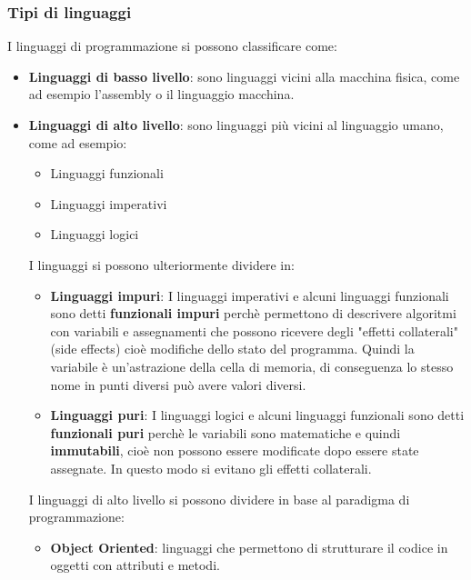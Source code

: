 \documentclass[a4paper]{article}
\begin{document}
\subsubsection{Tipi di linguaggi}
I linguaggi di programmazione si possono classificare come:
\begin{itemize}
  \item \textbf{Linguaggi di basso livello}: sono linguaggi vicini alla macchina fisica,
    come ad esempio l'assembly o il linguaggio macchina.

  \item \textbf{Linguaggi di alto livello}: sono linguaggi più vicini al linguaggio umano,
    come ad esempio:
    \begin{itemize}
      \item Linguaggi funzionali
      \item Linguaggi imperativi
      \item Linguaggi logici
    \end{itemize}

    \vspace{1em}
    \noindent
    I linguaggi si possono ulteriormente dividere in:
    \begin{itemize}
      \item \textbf{Linguaggi impuri}: 
        I linguaggi imperativi e alcuni linguaggi funzionali sono detti \textbf{funzionali impuri}
        perchè permettono di descrivere algoritmi con variabili e assegnamenti che
        possono ricevere degli "effetti collaterali" (side effects) cioè modifiche
        dello stato del programma. Quindi la variabile è un'astrazione della cella di memoria,
        di conseguenza lo stesso nome in punti diversi può avere valori diversi.

      \item \textbf{Linguaggi puri}:
        I linguaggi logici e alcuni linguaggi funzionali sono detti \textbf{funzionali puri}
        perchè le variabili sono matematiche e quindi \textbf{immutabili}, cioè non possono
        essere modificate dopo essere state assegnate. In questo modo si evitano gli
        effetti collaterali.
    \end{itemize}

    \vspace{1em}
    \noindent
    I linguaggi di alto livello si possono dividere in base al paradigma di programmazione:
    \begin{itemize}
      \item \textbf{Object Oriented}: linguaggi che permettono di strutturare il codice
        in oggetti con attributi e metodi.


\end{itemize}
\end{itemize}
\end{document}
